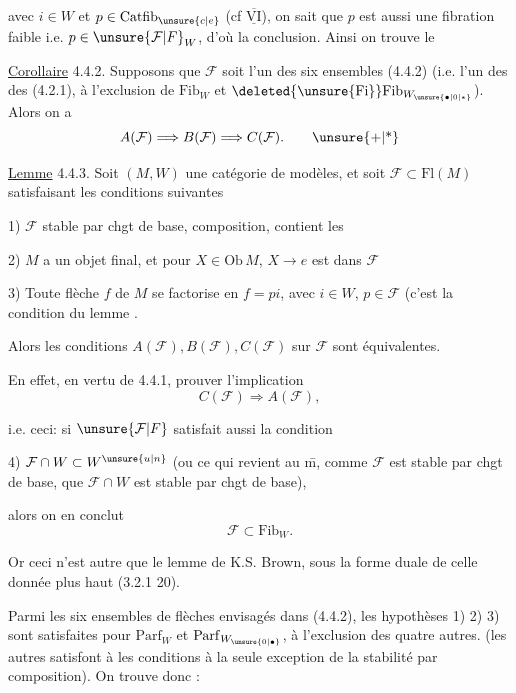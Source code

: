 avec $i\in W$ et $p\in\mathrm{Catfib}_{\unsure{c|e}}$ (cf $\overline{\underline{\mathrm{VI}}}$), on sait que $p$ est aussi une fibration faible i.e. $p\in\unsure{\mathcal{F}|F}_{W}$, d'où la conclusion. Ainsi on trouve le

\uline{Corollaire} 4.4.2. Supposons que $\mathcal{F}$ soit l'un des six ensembles (4.4.2) (i.e. l'un des  des   (4.2.1), à l'exclusion de $\mathrm{Fib}_{W}$ et $\deleted{\unsure{\mathrm{Fi}}}\mathrm{Fib}_{W_{\unsure{\bullet|0|*}}}$). Alors on a
\[
 A(\mathcal{F})\Longrightarrow B(\mathcal{F})\Longrightarrow C(\mathcal{F}). \tag*{\unsure{+|*}}
\]

\uline{Lemme} 4.4.3. Soit $(M,W)$ une catégorie de modèles, et soit $\mathcal{F}\subset\mathrm{Fl}(M)$ satisfaisant les conditions suivantes

1) $\mathcal{F}$ stable par chgt de base, composition, contient les 

2) $M$ a un objet final, et pour  $X\in\mathrm{Ob}\,M$, $X\longrightarrow e$ est dans $\mathcal{F}$

3) Toute flèche $f$ de $M$ se factorise en $f=pi$, avec $i\in W$, $p\in\mathcal{F}$ (c'est la condition du lemme .

Alors les conditions $A(\mathcal{F}),B(\mathcal{F}),C(\mathcal{F})$ sur $\mathcal{F}$ sont équivalentes.

En effet, en vertu de 4.4.1,     prouver l'implication
\[
 C(\mathcal{F})\Longrightarrow A(\mathcal{F}),
\]

i.e. ceci: si $\unsure{\mathcal{F}|F}$ satisfait aussi la condition

4) $\mathcal{F}\cap W\subset W^{\unsure{u|n}}$ (ou ce qui revient au \={m}, comme $\mathcal{F}$  est stable par chgt de base, que $\mathcal{F}\cap W$ est stable par chgt de base),

alors on en conclut
\[
 \mathcal{F}\subset\mathrm{Fib}_{W}.
\]

Or ceci n'est autre que le lemme de K.S. Brown, sous la forme duale de celle donnée plus haut (3.2.1\unsure{;|,}  20).

Parmi les six ensembles de flèches envisagés dans (4.4.2), les hypothèses 1) 2) 3) sont satisfaites pour $\mathrm{Parf}_{W}$ et $\mathrm{Parf}_{W_{\unsure{0|\bullet}}}$, à l'exclusion des quatre autres.   (les autres satisfont à  les conditions\unsure{;|,} à la seule exception de la stabilité par composition). On trouve donc :

